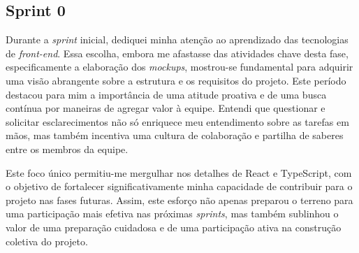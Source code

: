\subsection{Sprint 0}

Durante a \textit{sprint} inicial, dediquei minha atenção ao aprendizado das tecnologias de \textit{front-end}. Essa escolha, embora me afastasse das atividades chave desta fase, especificamente a elaboração dos \textit{mockups}, mostrou-se fundamental para adquirir uma visão abrangente sobre a estrutura e os requisitos do projeto. Este período destacou para mim a importância de uma atitude proativa e de uma busca contínua por maneiras de agregar valor à equipe. Entendi que questionar e solicitar esclarecimentos não só enriquece meu entendimento sobre as tarefas em mãos, mas também incentiva uma cultura de colaboração e partilha de saberes entre os membros da equipe.

Este foco único permitiu-me mergulhar nos detalhes de React e TypeScript, com o objetivo de fortalecer significativamente minha capacidade de contribuir para o projeto nas fases futuras. Assim, este esforço não apenas preparou o terreno para uma participação mais efetiva nas próximas \textit{sprints}, mas também sublinhou o valor de uma preparação cuidadosa e de uma participação ativa na construção coletiva do projeto.